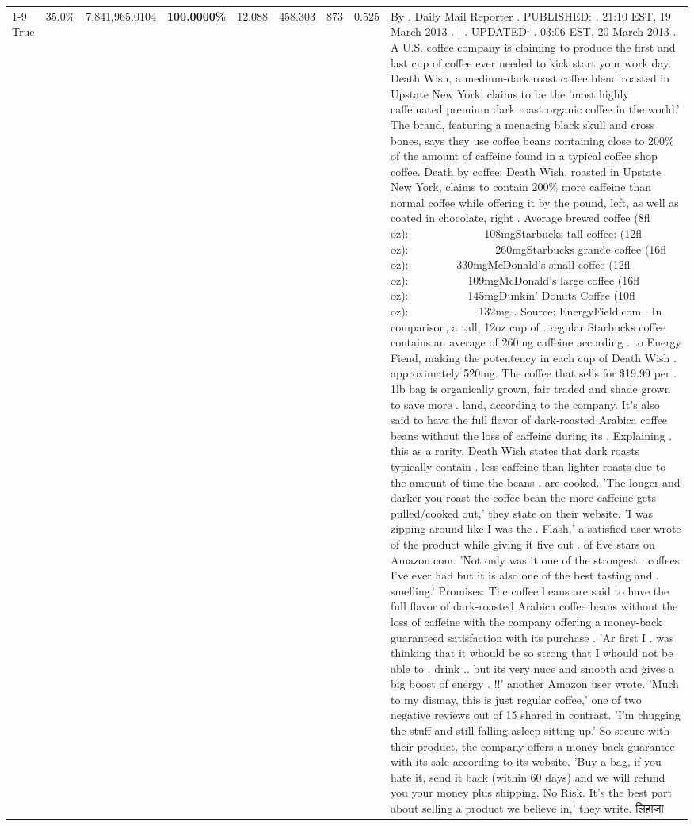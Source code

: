 \begin{table}[H]
{\begin{tabular}{lllrlllll}
\cline{1-9}
True & 35.0\% & 7,841,965.0104 & \bfseries \color{red} 100.0000\% & 12.088 & 458.303 & 873 & 0.525 & By . Daily Mail Reporter . PUBLISHED: . 21:10 EST, 19 March 2013 . | . UPDATED: . 03:06 EST, 20 March 2013 . A U.S. coffee company is claiming to produce the first and last cup of coffee ever needed to kick start your work day. Death Wish, a medium-dark roast coffee blend roasted in Upstate New York, claims to be the 'most highly caffeinated premium dark roast organic coffee in the world.' The brand, featuring a menacing black skull and cross bones, says they use coffee beans containing close to 200\% of the amount of caffeine found in a typical coffee shop coffee. Death by coffee: Death Wish, roasted in Upstate New York, claims to contain 200\% more caffeine than normal coffee while offering it by the pound, left, as well as coated in chocolate, right . Average brewed coffee (8fl oz):              108mgStarbucks tall coffee: (12fl oz):                260mgStarbucks grande coffee (16fl oz):         330mgMcDonald's small coffee (12fl oz):           109mgMcDonald's large coffee (16fl oz):           145mgDunkin' Donuts Coffee (10fl oz):             132mg . Source: EnergyField.com . In comparison, a tall, 12oz cup of . regular Starbucks coffee contains an average of 260mg caffeine according . to Energy Fiend, making the potentency in each cup of Death Wish . approximately 520mg. The coffee that sells for \$19.99 per . 1lb bag is organically grown, fair traded and shade grown to save more . land, according to the company. It's also said to have the full flavor of dark-roasted Arabica coffee beans without the loss of caffeine during its . Explaining . this as a rarity, Death Wish states that dark roasts typically contain . less caffeine than lighter roasts due to the amount of time the beans . are cooked. 'The longer and darker you roast the coffee bean the more caffeine gets pulled/cooked out,' they state on their website. 'I was zipping around like I was the . Flash,' a satisfied user wrote of the product while giving it five out . of five stars on Amazon.com. 'Not only was it one of the strongest . coffees I've ever had but it is also one of the best tasting and . smelling.’ Promises: The coffee beans are said to have the full flavor of dark-roasted Arabica coffee beans without the loss of caffeine with the company offering a money-back guaranteed satisfaction with its purchase . 'Ar first I . was thinking that it whould be so strong that I whould not be able to . drink .. but its very nuce and smooth and gives a big boost of energy . !!' another Amazon user wrote. 'Much to my dismay, this is just regular coffee,' one of two negative reviews out of 15 shared in contrast. 'I'm chugging the stuff and still falling asleep sitting up.' So secure with their product, the company offers a money-back guarantee with its sale according to its website. 'Buy a bag, if you hate it, send it back (within 60 days) and we will refund you your money plus shipping. No Risk. It’s the best part about selling a product we believe in,' they write. लिहाजा \\

\end{tabular}}
\end{table}
